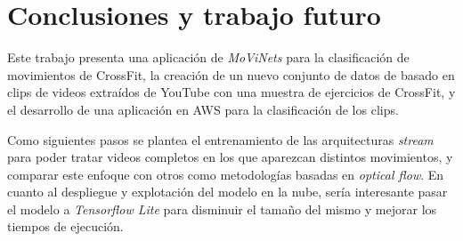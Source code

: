 \chapter{Conclusiones y trabajo futuro}\label{conclusiones}

Este trabajo presenta una aplicación de \textit{MoViNets} para la clasificación de movimientos de CrossFit, la creación de un nuevo conjunto de datos de basado en clips de videos extraídos de YouTube con una muestra de ejercicios de CrossFit, y el desarrollo de una aplicación en AWS para la clasificación de los clips.

Como siguientes pasos se plantea el entrenamiento de las arquitecturas \textit{stream} para poder tratar videos completos en los que aparezcan distintos movimientos, y comparar este enfoque con otros como metodologías basadas en \textit{optical flow}. En cuanto al despliegue y explotación del modelo en la nube, sería interesante pasar el modelo a \textit{Tensorflow Lite} para disminuir el tamaño del mismo y mejorar los tiempos de ejecución.
